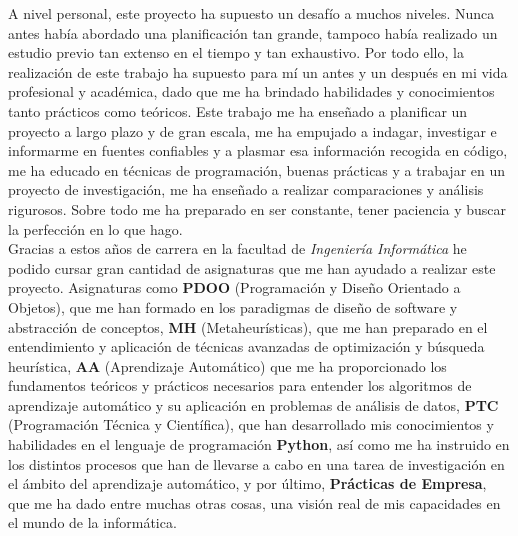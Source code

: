A nivel personal, este proyecto ha supuesto un desafío a muchos niveles. Nunca antes había abordado una planificación tan grande, tampoco había realizado un estudio previo tan extenso en el tiempo y tan exhaustivo. Por todo ello, la realización de este trabajo ha supuesto para mí un antes y un después en mi vida profesional y académica, dado que me ha brindado habilidades y conocimientos tanto prácticos como teóricos. Este trabajo me ha enseñado a planificar un proyecto a largo plazo y de gran escala, me ha empujado a indagar, investigar e informarme en fuentes confiables y a plasmar esa información recogida en código, me ha educado en técnicas de programación, buenas prácticas y a trabajar en un proyecto de investigación, me ha enseñado a realizar comparaciones y análisis rigurosos. Sobre todo me ha preparado en ser constante, tener paciencia y buscar la perfección en lo que hago.\\[6pt]
Gracias a estos años de carrera en la facultad de \textit{Ingeniería Informática} he podido cursar gran cantidad de asignaturas que me han ayudado a realizar este proyecto. Asignaturas como \textbf{PDOO} (Programación y Diseño Orientado a Objetos), que me han formado en los paradigmas de diseño de software y abstracción de conceptos, \textbf{MH} (Metaheurísticas), que me han preparado en el entendimiento y aplicación de técnicas avanzadas de optimización y búsqueda heurística, \textbf{AA} (Aprendizaje Automático) que me ha proporcionado los fundamentos teóricos y prácticos necesarios para entender los algoritmos de aprendizaje automático y su aplicación en problemas de análisis de datos, \textbf{PTC} (Programación Técnica y Científica), que han desarrollado mis conocimientos y habilidades en el lenguaje de programación \textbf{Python}, así como me ha instruido en los distintos procesos que han de llevarse a cabo en una tarea de investigación en el ámbito del aprendizaje automático, y por último, \textbf{Prácticas de Empresa}, que me ha dado entre muchas otras cosas, una visión real de mis capacidades en el mundo de la informática.